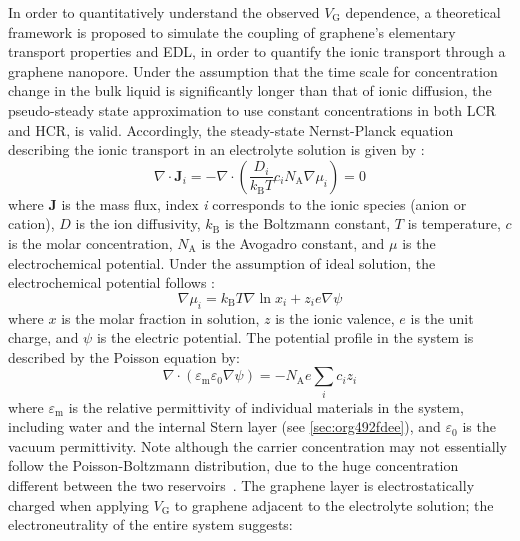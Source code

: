 In order to quantitatively understand the observed $V_{\mathrm{G}}$
dependence, a theoretical framework is proposed to simulate the
coupling of graphene's elementary transport properties and EDL, in
order to quantify the ionic transport through a graphene
nanopore. Under the assumption that the time scale for concentration
change in the bulk liquid is significantly longer than
that of ionic diffusion, the pseudo-steady state approximation to use constant concentrations in both LCR and HCR, is valid.
%
Accordingly, the steady-state Nernst-Planck equation describing
the ionic transport in an electrolyte solution is given by
\cite{MacGillivray_1968_NPE}:
\begin{equation}
  \label{eq:np-pnp}
  \nabla \cdot \symbf{J}_{i} = -\nabla \cdot (\frac{D_{i}}{k_{\mathrm{B}}T} c_{i} N_{\mathrm{A}} \nabla \mu_{i}) = 0
\end{equation}
where $\symbf{J}$ is the mass flux, index \textit{i} corresponds to
the ionic species (anion or cation), $D$ is the ion
diffusivity, $k_{\mathrm{B}}$ is the Boltzmann constant, $T$ is
temperature, $c$ is the molar concentration, $N_{\mathrm{A}}$ is the
Avogadro constant, and $\mu$ is the electrochemical potential. Under
the assumption of ideal solution, the electrochemical potential
follows \cite{Kilic_2007_steric_effect_ion}:
\begin{equation}
  \label{eq:np-mu}
  \nabla \mu_{i} = k_{\mathrm{B}} T \nabla \ln x_{i} + z_{i} e \nabla \psi
\end{equation}
where $x$ is the molar fraction in solution, $z$ is the ionic valence,
$e$ is the unit charge, and $\psi$ is the electric potential.
%
The potential profile in the system is described by the Poisson
equation by:
\begin{equation}
  \label{eq:np-poisson}
  \nabla \cdot (\varepsilon_{\mathrm{m}} \varepsilon_{0} \nabla \psi)
  =
  - N_{\mathrm{A}} e \sum_{i} c_{i} z_{i}
\end{equation}
where $\varepsilon_{\mathrm{m}}$ is the relative permittivity of
individual materials in the system, including water and the internal
Stern layer (see \autoref{sec:org492fdee}), and $\varepsilon_{0}$ is
the vacuum permittivity.
%
Note although the carrier concentration may not essentially follow the
Poisson-Boltzmann distribution, due to the huge concentration
different between the two reservoirs~\parencite*{Zheng_2011_PNPB}.
%
The graphene layer is electrostatically charged when
applying $V_{\mathrm{G}}$ to graphene adjacent to the electrolyte
solution; the electroneutrality of the entire system suggests:
